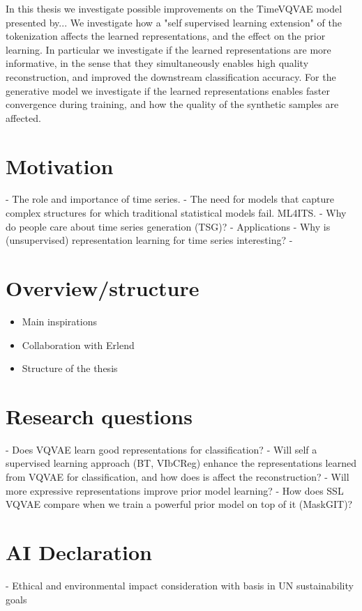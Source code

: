 \documentclass[../../thesis.tex]{subfiles}
\begin{document}
In this thesis we investigate possible improvements on the TimeVQVAE model presented by... We investigate how a "self supervised learning extension" of the tokenization affects the learned representations, and the effect on the prior learning. In particular we investigate if the learned representations are more informative, in the sense that they simultaneously enables high quality reconstruction, and improved the downstream classification accuracy. For the generative model we investigate if the learned representations enables faster convergence during training, and how the quality of the synthetic samples are affected. \\



\section{Motivation}
	- The role and importance of time series.
	- The need for models that capture complex structures for which traditional statistical models fail. ML4ITS. 
	- Why do people care about time series generation (TSG)?
		- Applications
	- Why is (unsupervised) representation learning for time series interesting?
	- 

\section{Overview/structure}
\begin{itemize}
	\item Main inspirations
	\cite{TimeVQVAE} 
	\item Collaboration with Erlend
	\item Structure of the thesis
\end{itemize}
\section{Research questions}
	- Does VQVAE learn good representations for classification?
	- Will self a supervised learning approach (BT, VIbCReg) enhance the representations learned from VQVAE for classification, and how does is affect the reconstruction? 
	- Will more expressive representations improve prior model learning?
	- How does SSL VQVAE compare when we train a powerful prior model on top of it (MaskGIT)? 



\section{AI Declaration}

- Ethical and environmental impact consideration with basis in UN sustainability goals
\end{document}
